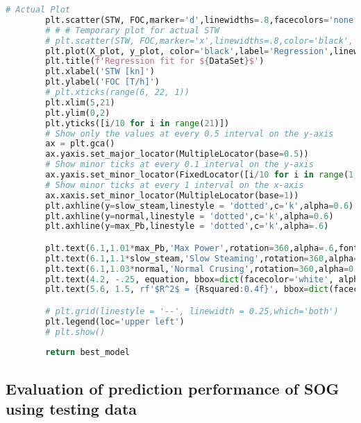 \begin{lstlisting}[language=Python]
        # Actual Plot
        plt.scatter(STW, FOC,marker='d',linewidths=.8,facecolors='none',edgecolors='blue',label = 'Predicted STW',s=12)
        # # # Temporary plot for actual STW 
        # plt.scatter(STW, FOC,marker='x',linewidths=.8,color='black', label = 'Actual STW',s=12)
        plt.plot(X_plot, y_plot, color='black',label='Regression',linewidth=.8)
        plt.title(f'Regression fit for ${DataSet}$')
        plt.xlabel('STW [kn]')
        plt.ylabel('FOC [T/h]')
        # plt.xticks(range(6, 22, 1))
        plt.xlim(5,21)
        plt.ylim(0,2)
        plt.yticks([i/10 for i in range(21)])
        # Show only the values at every 0.5 interval on the y-axis
        ax = plt.gca()
        ax.yaxis.set_major_locator(MultipleLocator(base=0.5))
        # Show minor ticks at every 0.1 interval on the y-axis
        ax.yaxis.set_minor_locator(FixedLocator([i/10 for i in range(1, 20)]))
        # Show minor ticks at every 1 interval on the x-axis
        ax.xaxis.set_minor_locator(MultipleLocator(base=1))
        plt.axhline(y=slow_steam,linestyle = 'dotted',c='k',alpha=0.6)
        plt.axhline(y=normal,linestyle = 'dotted',c='k',alpha=0.6)
        plt.axhline(y=max_Pb,linestyle = 'dotted',c='k',alpha=.6)

        plt.text(6.1,1.01*max_Pb,'Max Power',rotation=360,alpha=.6,fontsize=6)
        plt.text(6.1,1.1*slow_steam,'Slow Steaming',rotation=360,alpha=0.6,fontsize=6)
        plt.text(6.1,1.03*normal,'Normal Crusing',rotation=360,alpha=0.6,fontsize=6)
        plt.text(4.2, -.25, equation, bbox=dict(facecolor='white', alpha=0.9),fontsize=12)
        plt.text(5.6, 1.5, rf'$R^2$ = {Rsquared:0.4f}', bbox=dict(facecolor='white', alpha=0.9),fontsize=14)

        # plt.grid(linestyle = '--', linewidth = 0.25,which='both')
        plt.legend(loc='upper left')
        # plt.show()
        
        return best_model
\end{lstlisting}

\subsection*{Evaluation of prediction performance of SOG using testing data}

